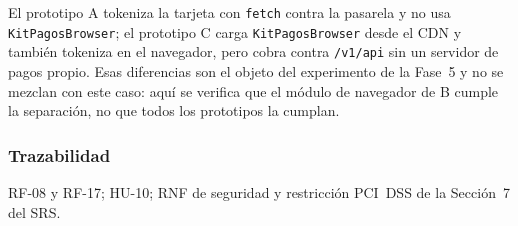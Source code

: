 El prototipo A tokeniza la tarjeta con \texttt{fetch} contra la pasarela y no usa \texttt{KitPagosBrowser}; el prototipo C carga \texttt{KitPagosBrowser} desde el CDN y también tokeniza en el navegador, pero cobra contra \texttt{/v1/api} sin un servidor de pagos propio. Esas diferencias son el objeto del experimento de la Fase~5 y no se mezclan con este caso: aquí se verifica que el módulo de navegador de B cumple la separación, no que todos los prototipos la cumplan.

\subsubsection{Trazabilidad}

RF-08 y RF-17; HU-10; RNF de seguridad y restricción PCI~DSS de la Sección~7 del SRS.
